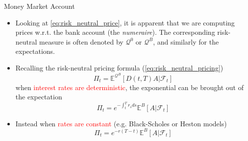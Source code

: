 \documentclass{beamer}
\begin{document}
\begin{frame}{Money Market Account}
\begin{itemize}
	\item<0-> Looking at \cref{eq:risk_neutral_price}, it is apparent that we are computing prices w.r.t. the bank account (the \emph{numeraire}). The corresponding risk-neutral measure is often denoted by $\mathcal{Q}^0$ or $\mathcal{Q}^B$, and similarly for the expectations. 
    \item<2-> Recalling the risk-neutral pricing formula (\cref{eq:risk_neutral_pricing})
    \begin{equation*}
    	\Pi_t = \mathbb{E}^{\mathcal{Q}^B}[D(t,T)A|\mathcal{F}_t]
    \end{equation*}
	when \textcolor{red}{interest rates are deterministic}, the exponential can be brought out of the expectation
	\begin{equation*}
		\Pi_t = e^{-\int_t^T r_s ds} \mathbb{E}^B\left[A|\mathcal{F}_t\right]
	\end{equation*}
	\item<3-> Instead when \textcolor{red}{rates are constant} (e.g. Black-Scholes or Heston models)
	\begin{equation*}
		\Pi_t = e^{-r(T-t)}\mathbb{E}^B\left[A|\mathcal{F}_t\right]
	\end{equation*}
\end{itemize}
\end{frame}
\end{document}
